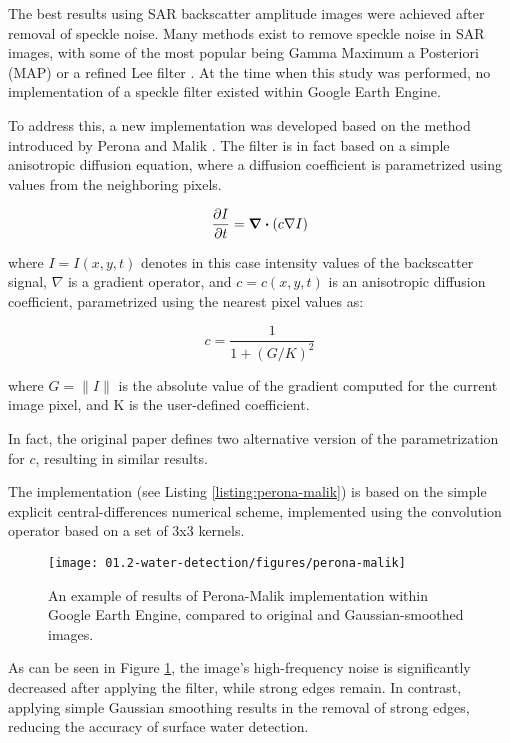 The best results using \gls{SAR} backscatter amplitude images were achieved after removal of speckle noise. Many methods exist to remove speckle noise in \gls{SAR} images, with some of the most popular being Gamma Maximum a Posteriori (MAP) \citet{lopes1990maximum} or a refined Lee filter \citet{lee1981speckle}. At the time when this study was performed, no implementation of a speckle filter existed within Google Earth Engine. 

To address this, a new implementation was developed based on the method introduced by Perona and Malik \citet{perona1990scale}. The filter is in fact based on a simple anisotropic diffusion equation, where a diffusion coefficient is parametrized using values from the neighboring pixels. 

\begin{equation}
\pdv{I}{t} = \div{ \left( c \nabla I\right) }
\end{equation}

where $I=I(x,y,t)$ denotes in this case intensity values of the backscatter signal, $\nabla$ is a gradient operator, and $c=c(x,y,t)$ is an anisotropic diffusion coefficient, parametrized using the nearest pixel values as:

\begin{equation}
c = \frac{1}{1 + \left(G/K\right)^2}
\end{equation}

where $G = \|  I\|$ is the absolute value of the gradient computed for the current image pixel, and K is the user-defined coefficient.

In fact, the original paper defines two alternative version of the parametrization for $c$, resulting in similar results.


The implementation (see Listing \ref{listing:perona-malik}) is based on the simple explicit central-differences numerical scheme, implemented using the convolution operator based on a set of 3x3 kernels. 

\begin{figure}[H]
	\texttt{[image: 01.2-water-detection/figures/perona-malik]}
	\caption{An example of results of Perona-Malik implementation within Google Earth Engine, compared to original and Gaussian-smoothed images. }
	\label{fig:perona-malik}
\end{figure}

As can be seen in Figure \ref{fig:perona-malik}, the image's high-frequency noise is significantly decreased after applying the filter, while strong edges remain. In contrast, applying simple Gaussian smoothing results in the removal of strong edges, reducing the accuracy of surface water detection.

